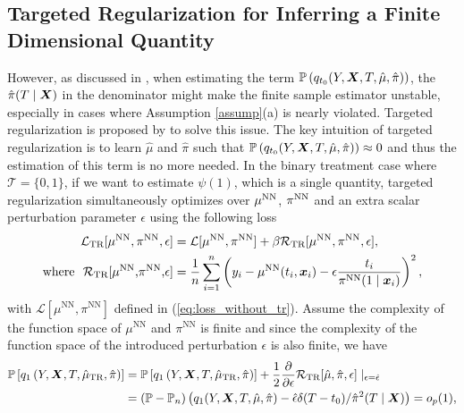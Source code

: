 \subsection{Targeted Regularization for Inferring a Finite Dimensional Quantity}
However, as discussed in \cite{shi2019adapting}, when estimating the term $\mathbb{P}\left(q_{t_{0}}(Y,\boldsymbol{X},T,\hat\mu,\hat\pi)\right)$, the $\hat{\pi}(T\mid\boldsymbol{X})$ in the denominator might make the finite sample estimator unstable, especially in cases where Assumption \ref{assump}(a) is nearly violated. Targeted regularization is proposed by \cite{shi2019adapting} to solve this issue. The key intuition of targeted regularization is to learn $\hat{\mu}$ and $\hat{\pi}$ such that $\mathbb{P}\left(q_{t_{0}}(Y,\boldsymbol{X},T,\hat\mu,\hat\pi)\right)\approx0$ and thus the estimation of this term is no more needed. In the binary treatment case where $\mathcal{T}=\{0,1\}$, if we want to estimate $\psi(1)$, which is a single quantity, targeted regularization simultaneously optimizes over $\mu^{\text{NN}}$, $\pi^{\text{NN}}$ and an extra scalar perturbation parameter $\epsilon$ using the following loss
\begin{align}\label{eq:loss_binary_ATE}
\mathcal{L}_{\text{TR}}[\mu^{\text{NN}},\pi^{\text{NN}},\epsilon] & =\mathcal{L}[\mu^{\text{NN}},\pi^{\text{NN}}]+\beta\mathcal{R}_{\text{TR}}[\mu^{\text{NN}},\pi^{\text{NN}},\epsilon],\\
\nonumber
\text{where\ \ \ensuremath{\mathcal{R}_\text{TR}}[\ensuremath{\mu^{\text{NN}}},\ensuremath{\pi^{\text{NN}}},\ensuremath{\epsilon}]} & =\frac{1}{n}\sum_{i=1}^{n}\left(y_{i}-\mu^{\text{NN}}(t_{i},\x_{i})-\epsilon\frac{ t_{i}}{\pi^{\text{NN}}(1\mid\x_{i})}\right)^{2},
\end{align}
with $\mathcal{L}[\mu^{\text{NN}},\pi^{\text{NN}}]$ defined in (\ref{eq:loss_without_tr}). Assume the complexity of the function space of $\mu^{\text{NN}}$ and $\pi^{\text{NN}}$ is finite and since the complexity of the function space of the introduced perturbation $\epsilon$ is also finite,  we have 
\begin{align*}
\mathbb{P}\left[q_{1}\left(Y,\boldsymbol{X},T,\hat{\mu}_{\text{TR}},\hat{\pi}\right)\right]
&=\mathbb{P}\left[q_{1}\left(Y,\boldsymbol{X},T,\hat{\mu}_{\text{TR}},\hat{\pi}\right)\right] + \frac{1}{2}\frac{\partial}{\partial\epsilon}\mathcal{R}_{\text{TR}}[\hat{\mu},\hat{\pi},{\epsilon}]\mid_{\epsilon=\hat\epsilon}
\\&
=(\mathbb{P}-\mathbb{P}_n)\left(q_1(Y,\boldsymbol{X},T,\hat\mu,\hat\pi)-\hat\epsilon\delta(T-t_0)/\hat\pi^2(T\mid\boldsymbol{X})\right)
=o_p(1),
\end{align*}
